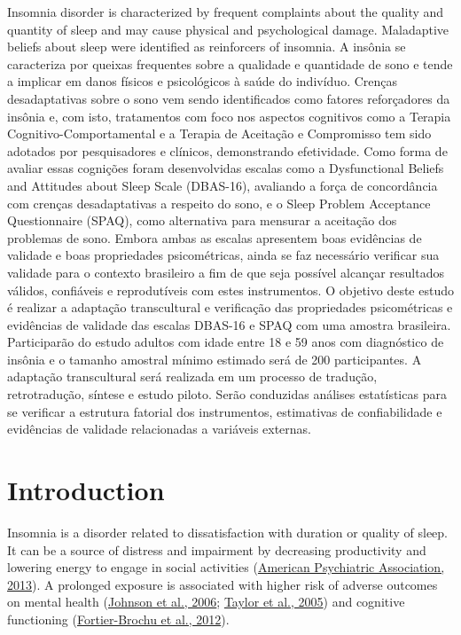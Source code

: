 \documentclass[
  ,doc,11pt, twoside,floatsintext]{apa6}
\begin{document}
Insomnia disorder is characterized by frequent complaints about the quality and quantity of sleep and may cause physical and psychological damage. Maladaptive beliefs about sleep were identified as reinforcers of insomnia. A insônia se caracteriza por queixas frequentes sobre a qualidade e quantidade de sono e tende a implicar em danos físicos e psicológicos à saúde do indivíduo. Crenças desadaptativas sobre o sono vem sendo identificados como fatores reforçadores da insônia e, com isto, tratamentos com foco nos aspectos cognitivos como a Terapia Cognitivo-Comportamental e a Terapia de Aceitação e Compromisso tem sido adotados por pesquisadores e clínicos, demonstrando efetividade. Como forma de avaliar essas cognições foram desenvolvidas escalas como a Dysfunctional Beliefs and Attitudes about Sleep Scale (DBAS-16), avaliando a força de concordância com crenças desadaptativas a respeito do sono, e o Sleep Problem Acceptance Questionnaire (SPAQ), como alternativa para mensurar a aceitação dos problemas de sono. Embora ambas as escalas apresentem boas evidências de validade e boas propriedades psicométricas, ainda se faz necessário verificar sua validade para o contexto brasileiro a fim de que seja possível alcançar resultados válidos, confiáveis e reprodutíveis com estes instrumentos. O objetivo deste estudo é realizar a adaptação transcultural e verificação das propriedades psicométricas e evidências de validade das escalas DBAS-16 e SPAQ com uma amostra brasileira. Participarão do estudo adultos com idade entre 18 e 59 anos com diagnóstico de insônia e o tamanho amostral mínimo estimado será de 200 participantes. A adaptação transcultural será realizada em um processo de tradução, retrotradução, síntese e estudo piloto. Serão conduzidas análises estatísticas para se verificar a estrutura fatorial dos instrumentos, estimativas de confiabilidade e evidências de validade relacionadas a variáveis externas.

\newpage

\hypertarget{introduction}{%
\section{Introduction}\label{introduction}}

Insomnia is a disorder related to dissatisfaction with duration or quality of sleep. It can be a source of distress and impairment by decreasing productivity and lowering energy to engage in social activities (\protect\hyperlink{ref-americanpsychiatricassociation2013}{American Psychiatric Association, 2013}). A prolonged exposure is associated with higher risk of adverse outcomes on mental health (\protect\hyperlink{ref-johnson2006}{Johnson et al., 2006}; \protect\hyperlink{ref-taylor2005}{Taylor et al., 2005}) and cognitive functioning (\protect\hyperlink{ref-fortier-brochu2012}{Fortier-Brochu et al., 2012}).
\end{document}
